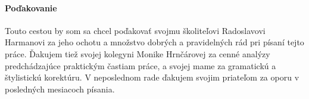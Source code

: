 

\vfill
\thispagestyle{empty}
\paragraph{Poďakovanie}

Touto cestou by som sa chcel poďakovať svojmu školiteľovi Radoslavovi Harmanovi za jeho ochotu a množstvo dobrých a pravidelných rád pri písaní tejto práce.
Ďakujem tiež svojej kolegyni Monike Hrnčárovej za cenné analýzy predchádzajúce praktickým častiam práce, a svojej mame za gramatickú a štylistickú korektúru.
V neposlednom rade ďakujem svojim priateľom za oporu v posledných mesiacoch písania.
